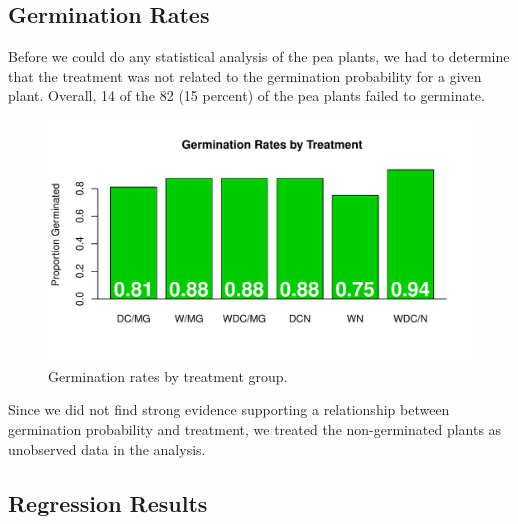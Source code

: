 \documentclass[preprint,12pt]{elsarticle}\usepackage[]{graphicx}\usepackage[]{color}
\makeatletter
\def\maxwidth{ %
  \ifdim\Gin@nat@width>\linewidth
    \linewidth
  \else
    \Gin@nat@width
  \fi
}
\newenvironment{knitrout}{}{} %
\makeatother
\begin{document}
\subsection{Germination Rates}
Before we could do any statistical analysis of the pea plants, we had to determine that the treatment was not related to the germination probability for a given plant. Overall, 14 of the 82 (15 percent) of the pea plants failed to germinate. 
\begin{knitrout}
\color{fgcolor}\begin{figure}
\includegraphics[width=\maxwidth]{figure/germination_rates-1} \caption[Germination rates by treatment group]{Germination rates by treatment group.}\label{fig:germination_rates}
\end{figure}


\end{knitrout}

Since we did not find strong evidence supporting a relationship between germination probability and treatment, we treated the non-germinated plants as unobserved data in the analysis. 



\subsection{Regression Results}
\end{document}
